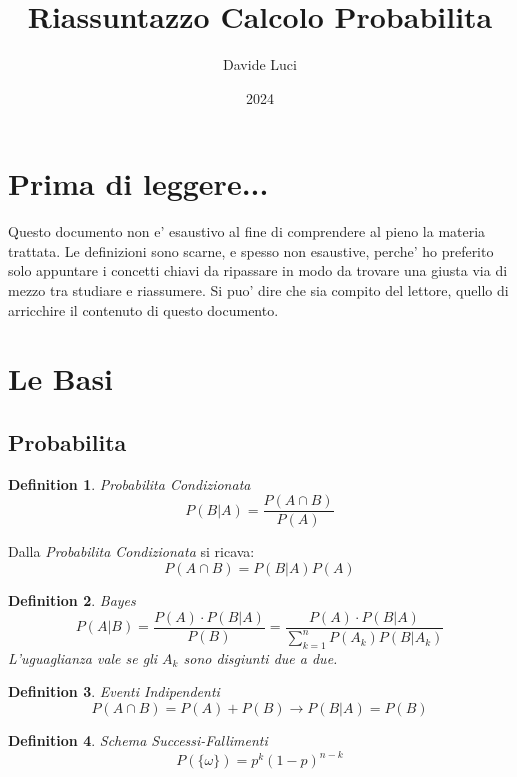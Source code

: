 \documentclass{article}
\title{Riassuntazzo Calcolo Probabilita}
\author{Davide Luci}
\date{2024}
\newtheorem{definition}{Definition}[section]
\begin{document}
    \maketitle
    \tableofcontents
    \newpage


    \setlength{\parindent}{0pt}
    \section{ Prima di leggere...}
    Questo documento non e' esaustivo al fine di comprendere al pieno la materia trattata.
    Le definizioni sono scarne, e spesso non esaustive, perche' ho preferito solo appuntare i concetti chiavi
    da ripassare in modo da trovare una giusta via di mezzo tra studiare e riassumere. Si puo' dire che sia compito del 
    lettore, quello di arricchire il contenuto di questo documento.

    \newpage

    \section{ Le Basi}
    \subsection{Probabilita}
    \begin{definition} Probabilita Condizionata \\
        $$
        P(B|A) = \frac{P(A \cap B)}{P(A)}
        $$
    \end{definition}

    Dalla \textit{Probabilita Condizionata} si ricava:
    $$
    P(A \cap B) = P(B|A) P(A)
    $$

    \begin{definition} Bayes
        $$
        P(A|B) = \frac{P(A) \cdot P(B|A)}{P(B)} = \frac{P(A) \cdot P(B|A)}{\sum_{k=1}^n P(A_k)P(B|A_k)} 
        $$
        L'uguaglianza vale se gli $A_k$ sono disgiunti due a due.
    \end{definition}

    \begin{definition} Eventi Indipendenti
        $$
        P(A \cap B) = P(A) + P(B) \to P(B|A) = P(B)
        $$
    \end{definition}

    \begin{definition} Schema Successi-Fallimenti
        $$
        P(\{\omega\}) = p^k (1-p)^{n-k }
        $$
    \end{definition}
\end{document}
